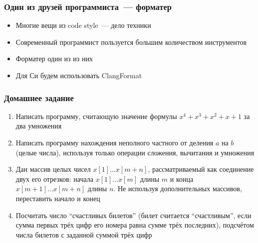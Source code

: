 \documentclass[aspectratio=169]{beamer}
\begin{document}
\begin{frame}
    \frametitle{Один из друзей программиста~--- форматер}

    \begin{itemize}
        \item Многие вещи из code style~--- дело техники
        \item Современный программист пользуется большим количеством инструментов
        \item Форматер один из из них
        \item Для Си будем использовать ClangFormat
    \end{itemize}

\end{frame}


\begin{frame}
    \frametitle{Домашнее задание}

    \begin{enumerate}
        \item Написать программу, считающую значение формулы $x^4 + x^3 + x^2 + x + 1$ за два умножения
        \item Написать программу нахождения неполного частного от деления $a$ на $b$ (целые числа), используя только операции сложения, вычитания и умножения
        \item Дан массив целых чисел $x[1] \dots x[m + n]$, рассматриваемый как соединение двух его отрезков: начала $x[1] \dots x[m]$ длины $m$ и конца $x[m + 1] \dots x[m + n]$ длины $n$.
              Не используя дополнительных массивов, переставить начало и конец %
        \item Посчитать число \enquote{счастливых билетов} (билет считается \enquote{счастливым}, если сумма первых трёх цифр его номера равна сумме трёх последних), подсчётом числа билетов с заданной суммой трёх цифр
    \end{enumerate}

\end{frame}
\end{document}
